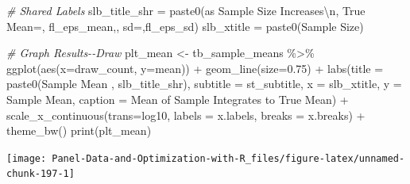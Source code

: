 \documentclass[
]{book}
\newenvironment{Shaded}{\begin{snugshade}}{\end{snugshade}}
\newcommand{\AttributeTok}[1]{\textcolor[rgb]{0.77,0.63,0.00}{#1}}
\newcommand{\CommentTok}[1]{\textcolor[rgb]{0.56,0.35,0.01}{\textit{#1}}}
\newcommand{\FloatTok}[1]{\textcolor[rgb]{0.00,0.00,0.81}{#1}}
\newcommand{\FunctionTok}[1]{\textcolor[rgb]{0.00,0.00,0.00}{#1}}
\newcommand{\NormalTok}[1]{#1}
\newcommand{\OtherTok}[1]{\textcolor[rgb]{0.56,0.35,0.01}{#1}}
\newcommand{\SpecialCharTok}[1]{\textcolor[rgb]{0.00,0.00,0.00}{#1}}
\newcommand{\StringTok}[1]{\textcolor[rgb]{0.31,0.60,0.02}{#1}}
\begin{document}
\begin{Shaded}
\begin{Highlighting}[]
\CommentTok{\# Shared Labels}
\NormalTok{slb\_title\_shr }\OtherTok{=} \FunctionTok{paste0}\NormalTok{(}\StringTok{\textquotesingle{}as Sample Size Increases}\SpecialCharTok{\textbackslash{}n}\StringTok{\textquotesingle{}}\NormalTok{,}
                       \StringTok{\textquotesingle{}True Mean=\textquotesingle{}}\NormalTok{, fl\_eps\_mean,}\StringTok{\textquotesingle{}, sd=\textquotesingle{}}\NormalTok{,fl\_eps\_sd)}
\NormalTok{slb\_xtitle }\OtherTok{=} \FunctionTok{paste0}\NormalTok{(}\StringTok{\textquotesingle{}Sample Size\textquotesingle{}}\NormalTok{)}

\CommentTok{\# Graph Results{-}{-}Draw}
\NormalTok{plt\_mean }\OtherTok{\textless{}{-}}\NormalTok{ tb\_sample\_means }\SpecialCharTok{\%\textgreater{}\%}
  \FunctionTok{ggplot}\NormalTok{(}\FunctionTok{aes}\NormalTok{(}\AttributeTok{x=}\NormalTok{draw\_count, }\AttributeTok{y=}\NormalTok{mean)) }\SpecialCharTok{+}
  \FunctionTok{geom\_line}\NormalTok{(}\AttributeTok{size=}\FloatTok{0.75}\NormalTok{) }\SpecialCharTok{+}
  \FunctionTok{labs}\NormalTok{(}\AttributeTok{title =} \FunctionTok{paste0}\NormalTok{(}\StringTok{\textquotesingle{}Sample Mean \textquotesingle{}}\NormalTok{, slb\_title\_shr),}
       \AttributeTok{subtitle =}\NormalTok{ st\_subtitle,}
       \AttributeTok{x =}\NormalTok{ slb\_xtitle,}
       \AttributeTok{y =} \StringTok{\textquotesingle{}Sample Mean\textquotesingle{}}\NormalTok{,}
       \AttributeTok{caption =} \StringTok{\textquotesingle{}Mean of Sample Integrates to True Mean\textquotesingle{}}\NormalTok{) }\SpecialCharTok{+}
  \FunctionTok{scale\_x\_continuous}\NormalTok{(}\AttributeTok{trans=}\StringTok{\textquotesingle{}log10\textquotesingle{}}\NormalTok{, }\AttributeTok{labels =}\NormalTok{ x.labels, }\AttributeTok{breaks =}\NormalTok{ x.breaks) }\SpecialCharTok{+}
  \FunctionTok{theme\_bw}\NormalTok{()}
\FunctionTok{print}\NormalTok{(plt\_mean)}
\end{Highlighting}
\end{Shaded}

\begin{center}\texttt{[image: Panel-Data-and-Optimization-with-R\_files/figure-latex/unnamed-chunk-197-1]} \end{center}
\end{document}
